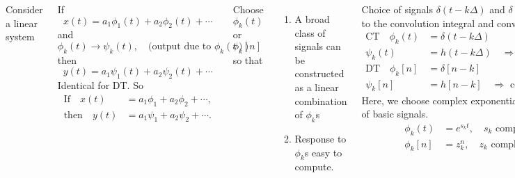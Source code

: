 \begin{frame}[plain]
    \begin{columns}
                Consider a linear system
                {
                \par
                }
                If
                \begin{equation*}
                    x(t) = a_1\phi_1(t) + a_2\phi_2(t) + \cdots
                \end{equation*}
                and
                \begin{equation*}
                    \phi_k(t) \longrightarrow \psi_k(t), \quad \text{(output due to $\phi_k(t) $)}
                \end{equation*}
                then
                \pause
                \begin{equation*}
                    y(t) = a_1\psi_1(t) + a_2\psi_2(t) + \cdots
                \end{equation*}
                Identical for DT. So
                \pause
                \begin{align*}
                   \text{If}\quad x(t) &= a_1\phi_1 + a_2\phi_2 + \cdots,\\
                   \text{then}\quad y(t) &= a_1\psi_1 + a_2\psi_2 + \cdots.
                \end{align*}

                \pause
                Choose $\phi_k(t)$ or $\phi_k[n]$ so that
                \begin{enumerate}
                    \item A broad class of signals can be constructed as a linear combination of $\phi_k$s
                    \item Response to $\phi_k$s easy to compute.
                \end{enumerate}
                \pause
                Choice of signals $\delta(t-k\Delta)$ and $\delta[n-k]$ lead to the convolution integral and convolution sum.
                \begin{align*}
                    \text{CT}\quad \phi_k(t) &=  \delta(t-k\Delta)\\
                    \psi_k(t) &= h(t-k\Delta)\quad \Rightarrow \text{ convolution integral}\\
                    \text{DT}\quad \phi_k[n] &=  \delta[n-k]\\
                    \psi_k[n] &= h[n-k]\quad \Rightarrow \text{ convolution sum}
                \end{align*}
                \pause
                Here, we  choose complex exponentials as the set of basic signals.
                \begin{align*}
                    \phi_k(t) &= e^{s_k t},\quad s_k \text{ complex}\\
                    \phi_k[n] &= z_k^n,\quad z_k \text{ complex}\\
                \end{align*}

    \end{columns}
\end{frame}

